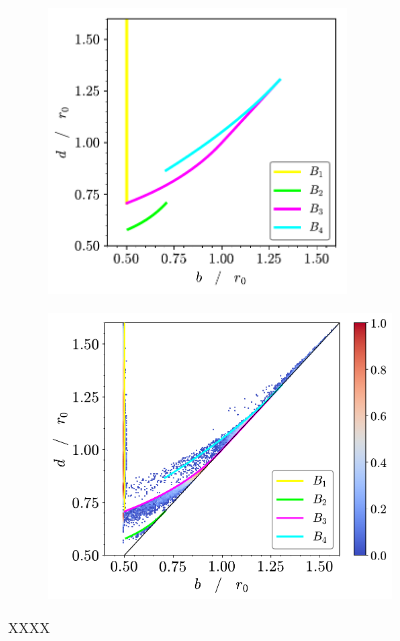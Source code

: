 \begin{figure}[tb]
	\centering
     
     \begin{subfigure}[b]{0.48\textwidth}
         \centering
         \includegraphics[width=0.87\textwidth]{./figures/ph/blines.pdf}
         \caption{}
         \label{fig:blines}
     \end{subfigure}
     \hfill
      \begin{subfigure}[b]{0.48\textwidth}
         \centering
         \includegraphics[width=\textwidth]{./figures/ph/blines_overlay.pdf}
         \caption{}
         \label{fig:blines}
     \end{subfigure}
 
	\caption{XXXX}
	\label{fig:blines}
\end{figure}


